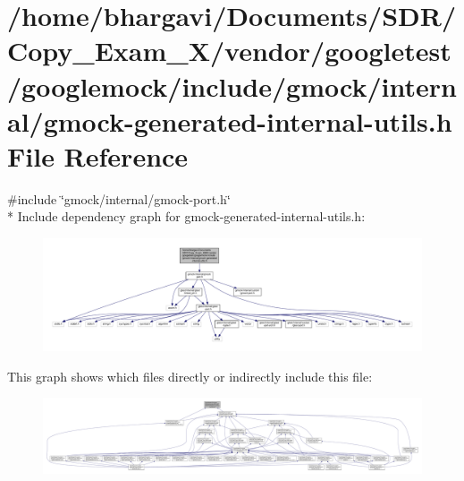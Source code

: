 \hypertarget{gmock-generated-internal-utils_8h}{}\section{/home/bhargavi/\+Documents/\+S\+D\+R/\+Copy\+\_\+\+Exam\+\_\+X/vendor/googletest/googlemock/include/gmock/internal/gmock-\/generated-\/internal-\/utils.h File Reference}
\label{gmock-generated-internal-utils_8h}
{\ttfamily \#include \char`\"{}gmock/internal/gmock-\/port.\+h\char`\"{}}\\*
Include dependency graph for gmock-\/generated-\/internal-\/utils.h\+:
\nopagebreak
\begin{figure}[H]
\begin{center}
\leavevmode
\includegraphics[width=350pt]{gmock-generated-internal-utils_8h__incl}
\end{center}
\end{figure}
This graph shows which files directly or indirectly include this file\+:
\nopagebreak
\begin{figure}[H]
\begin{center}
\leavevmode
\includegraphics[width=350pt]{gmock-generated-internal-utils_8h__dep__incl}
\end{center}
\end{figure}
